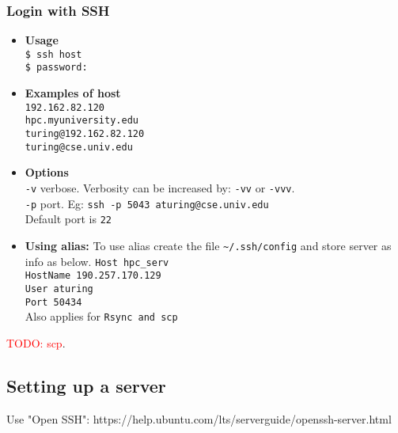 \subsubsection{Login with SSH}
\begin{itemize}
\item \textbf{Usage}\\
\texttt{\$ ssh host}\\
\texttt{\$ password:}\\

\item \textbf{Examples of host}\\
\texttt{192.162.82.120}\\
\texttt{hpc.myuniversity.edu}\\
\texttt{turing@192.162.82.120}\\
\texttt{turing@cse.univ.edu}\\

\item \textbf{Options} \\

\texttt{-v} verbose. Verbosity can be increased by: \texttt{-vv} or \texttt{-vvv}. \\
\texttt{-p} port. Eg: \texttt{ssh -p 5043 aturing@cse.univ.edu}\\
\qquad Default port is \texttt{22}

 
\item \textbf{Using alias:} To use alias create the file \texttt{\~{}/.ssh/config} and store server as info as below. 
\texttt{Host hpc\_serv}\\
\qquad \texttt{HostName 190.257.170.129}\\
\qquad \texttt{User aturing}\\
\qquad \texttt{Port 50434}\\
Also applies for \texttt{Rsync and scp}\\

\end{itemize}

\textcolor{red}{TODO: scp}.


\subsection{Setting up a server}
Use "Open SSH": https://help.ubuntu.com/lts/serverguide/openssh-server.html\\

\vfill \null
\columnbreak